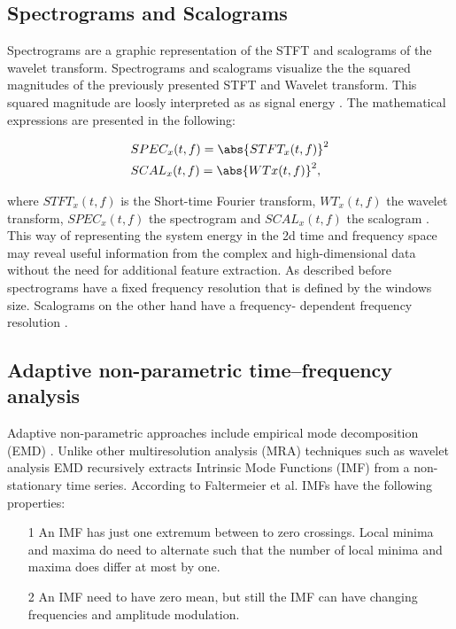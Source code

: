 \subsection{Spectrograms and Scalograms}

 Spectrograms are a graphic representation of the STFT and scalograms of the wavelet transform. Spectrograms and scalograms visualize the the squared magnitudes of the previously presented STFT and Wavelet transform. This squared magnitude are loosly interpreted as as signal energy \cite{Hlawatsch1992}. The mathematical expressions are presented in the following: 

\begin{equation}
    \begin{aligned}
        &SPEC_{x}(t,f) = \abs{STFT_{x}(t,f)}^{2} \\
        &SCAL_{x}(t,f) = \abs{WT{x}(t,f)}^{2}, 
    \end{aligned}
\end{equation}

where $STFT_{x}(t,f)$ is the Short-time Fourier transform, $WT_{x}(t,f)$ the wavelet transform, $SPEC_{x}(t,f)$ the spectrogram and $SCAL_{x}(t,f)$ the scalogram \cite{Hlawatsch1992}. This way of representing the system energy in the 2d time and frequency space may reveal useful information from the complex and high-dimensional data without the need for additional feature extraction. As described before spectrograms have a fixed frequency resolution that is defined by the windows size. Scalograms on the other hand have a frequency- dependent frequency resolution \cite{Verstraete2017}.

\subsection{Adaptive non-parametric time–frequency analysis}
Adaptive non-parametric approaches include empirical mode decomposition (EMD) \cite{FENG2013}. Unlike other multiresolution analysis (MRA) techniques such as wavelet analysis EMD recursively extracts Intrinsic Mode Functions (IMF) from a non-stationary time series. According to Faltermeier et al. \cite{Faltermeier2010} IMFs have the following properties: 

\begin{itemize}
    \item [1] An IMF has just one extremum between to zero crossings. Local minima and maxima do need to alternate such that the number of local minima and maxima does differ at most by one. 
    \item[2] An IMF need to have zero mean, but still the IMF can have changing frequencies and amplitude modulation. 
\end{itemize}

